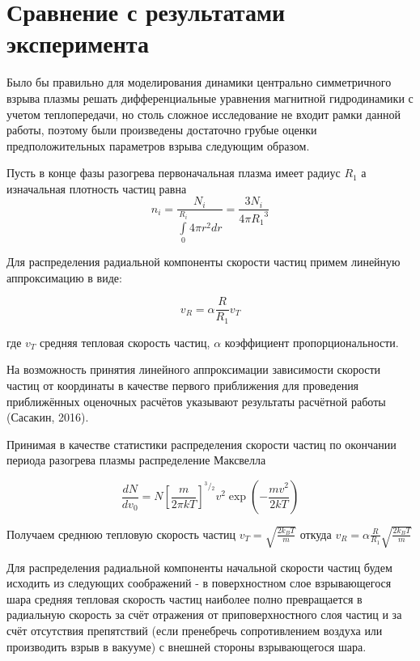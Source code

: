 \documentclass[12pt]{article}
\begin{document}
\section{Сравнение с результатами эксперимента}


Было бы правильно для моделирования динамики центрально симметричного взрыва плазмы решать дифференциальные уравнения магнитной гидродинамики с учетом теплопередачи, но столь сложное исследование не входит рамки данной работы, поэтому были произведены достаточно грубые оценки предположительных параметров взрыва следующим образом.

Пусть в конце фазы разогрева первоначальная плазма имеет радиус ${{R}_{1}}$ а изначальная плотность частиц равна   \[{{n}_{i}}=\frac{{{N}_{i}}}{\int\limits_{0}^{{{R}_{i}}}{4\pi {{r}^{2}}dr}}=\frac{3{{N}_{i}}}{4\pi {{R}_{1}}^{3}}\]

Для распределения радиальной компоненты скорости частиц примем линейную аппроксимацию в виде: 

	$${{v}_{R}}=\alpha \frac{R}{{{R}_{1}}}{{v}_{T}}$$
	
где ${{v}_{T}}$ средняя тепловая скорость частиц, $\alpha $ коэффициент пропорциональности.

На возможность принятия линейного аппроксимации зависимости скорости частиц от координаты в качестве первого приближения для проведения приближённых оценочных расчётов указывают результаты расчётной работы (Сасакин, 2016).

Принимая в качестве статистики распределения скорости частиц по окончании периода разогрева плазмы распределение Максвелла 

	\[\frac{dN}{d{{v}_{0}}}=N{{\left[ \frac{m}{2\pi kT} \right]}^{{}^{3}/{}_{2}}}{{v}^{2}}\exp \left( -\frac{m{{v}^{2}}}{2kT} \right)\]


Получаем  среднюю тепловую скорость частиц  ${{v}_{T}}=\sqrt{\frac{2{{k}_{B}}T}{m}}$ откуда
	${{v}_{R}}=\alpha \frac{R}{{{R}_{1}}}\sqrt{\frac{2{{k}_{B}}T}{m}}$

Для распределения радиальной компоненты начальной скорости частиц будем исходить из следующих соображений - в поверхностном слое взрывающегося шара средняя тепловая скорость частиц наиболее полно превращается в радиальную скорость за счёт отражения от приповерхностного слоя частиц и за счёт отсутствия препятствий (если пренебречь сопротивлением воздуха или производить взрыв в вакууме) с внешней стороны взрывающегося шара.
\end{document}

